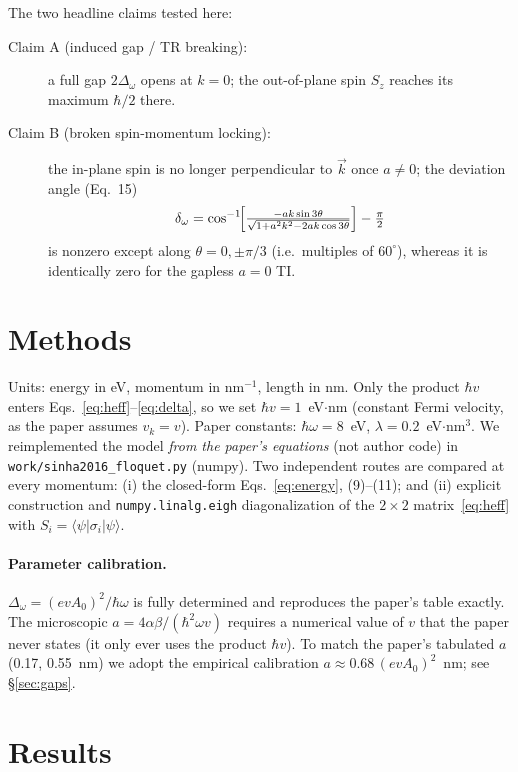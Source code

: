 \documentclass[11pt]{article}
\newcommand{\hv}{\hbar v}
\newcommand{\dw}{\Delta_\omega}
\begin{document}
The two headline claims tested here:
\begin{description}
  \item[Claim A (induced gap / TR breaking):] a full gap $2\dw$ opens at $k=0$;
    the out-of-plane spin $S_z$ reaches its maximum $\hbar/2$ there.
  \item[Claim B (broken spin-momentum locking):] the in-plane spin is no longer
    perpendicular to $\vec k$ once $a\neq0$; the deviation angle (Eq.~15)
    \begin{equation}
    \delta_\omega=\cos^{-1}\!\Bigl[\tfrac{-ak\sin 3\theta}{\sqrt{1+a^2k^2-2ak\cos 3\theta}}\Bigr]-\tfrac{\pi}{2}
    \label{eq:delta}
    \end{equation}
    is nonzero except along $\theta=0,\pm\pi/3$ (i.e.\ multiples of $60^\circ$),
    whereas it is identically zero for the gapless $a=0$ TI.
\end{description}

\section{Methods}
Units: energy in eV, momentum in nm$^{-1}$, length in nm. Only the product
$\hv$ enters Eqs.~\eqref{eq:heff}--\eqref{eq:delta}, so we set $\hv=1$~eV$\cdot$nm
(constant Fermi velocity, as the paper assumes $v_k=v$). Paper constants:
$\hbar\omega=8$~eV, $\lambda=0.2$~eV$\cdot$nm$^3$. We reimplemented the model
\emph{from the paper's equations} (not author code) in
\texttt{work/sinha2016\_floquet.py} (numpy). Two independent routes are compared
at every momentum: (i) the closed-form Eqs.~\eqref{eq:energy}, (9)--(11); and
(ii) explicit construction and \texttt{numpy.linalg.eigh} diagonalization of the
$2\times2$ matrix~\eqref{eq:heff} with $S_i=\langle\psi|\sigma_i|\psi\rangle$.

\paragraph{Parameter calibration.} $\dw=(evA_0)^2/\hbar\omega$ is fully
determined and reproduces the paper's table exactly. The microscopic $a=
4\alpha\beta/(\hbar^2\omega v)$ requires a numerical value of $v$ that the paper
never states (it only ever uses the product $\hv$). To match the paper's
tabulated $a$ (0.17, 0.55~nm) we adopt the empirical calibration
$a\approx0.68\,(evA_0)^2$~nm; see \S\ref{sec:gaps}.

\section{Results}
\end{document}
